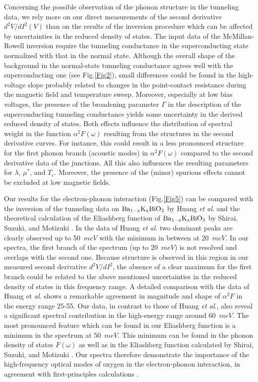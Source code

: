 \documentclass[twocolumn,amsmath,floats,showpacs,nofootinbib]{revtex4}
\begin{document}
Concerning the possible observation of the phonon structure in the tunneling data, we rely more on our direct measurements of the second derivative $d^2V/dI^2(V)$ than on the results of the inversion procedure which can be affected by uncertainties in the reduced density of states. The input data of the McMillan-Rowell inversion require the tunneling conductance in the superconducting state normalized with that in the normal state. Although the overall shape of the background in the normal-state tunneling conductance agrees well with the superconducting one (see Fig.\ref{Fig2}), small differences could be found in the high-voltage slope probably related to changes in the point-contact resistance during the magnetic field and temperature sweep. Moreover, especially at low bias voltages, the presence of the broadening parameter $\Gamma$ in the description of the superconducting tunneling conductance yields some
uncertainty in the derived reduced density of states. Both effects influence the distribution of spectral weight in the function $\alpha^2F(\omega)$ resulting from the structures in the second derivative curves. For instance, this could result in a less pronounced structure for the first phonon branch (acoustic modes) in $\alpha^2F(\omega)$ compared to the second derivative data of the junctions. All this also influences the resulting parameters for $\lambda$, $\mu^*$, and $T_c$. Moreover, the presence of the (minor) spurious effects cannot be excluded at low magnetic fields.

Our results for the electron-phonon interaction (Fig.\ref{Fig5}) can be compared with the inversion of the tunneling data on $\rm Ba_{1-x}K_xBiO_3$ by Huang \emph{et al}. \cite{7} and the theoretical calculation of the Eliashberg function of $\rm Ba_{1-x}K_xBiO_3$ by Shirai, Suzuki, and Motizuki \cite{12}. In the data of Huang \emph{et al}. two dominant peaks are clearly observed up to 50~$meV$ with the minimum in between at 20~$meV$. In our spectra, the first branch of the spectrum (up to 20~$meV$) is not resolved and overlaps with the second one. Because structure is observed in this region in our measured second derivative $d^2V /dI^2$, the absence of a clear maximum for the first branch could be related to the above mentioned uncertainties in the reduced density of states in this frequency range. A detailed comparison with the data of Huang et \emph{al}.\cite{7} shows a remarkable agreement in magnitude and shape of $\alpha^2F$ in the energy range 25-55. Our data, in contrast to those of Huang \emph{et al}., also reveal a significant spectral contribution in the high-energy range around 60~$meV$. The most pronounced feature which can be found in our Eliashberg function is a minimum in the spectrum at 50~$meV$. This minimum can be found in the phonon density of states $F(\omega)$ as well as in the Eliashberg function calculated by Shirai, Suzuki, and Motizuki  \cite{12}. Our spectra therefore demonstrate the importance of the high-frequency optical modes of oxygen in the electron-phonon interaction, in agreement with first-principles calculations \cite{12}.
\end{document}
